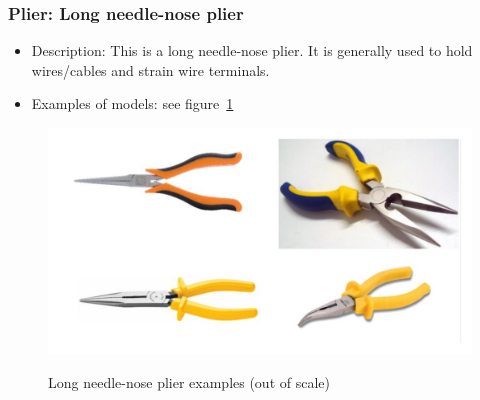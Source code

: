 \subsubsection{Plier: Long needle-nose plier} \label{DEVICE:TOOLPLIERNEEDLENOSE}
\begin{itemize}
  \item Description: This is a long needle-nose plier. It is generally used to hold wires/cables and strain wire terminals.
  \item Examples of models: see figure~\ref{FIG:DEVICETOOLPLIERNEEDLENOSE}
\end{itemize}
\begin{figure}
  \centering
  \includegraphics[angle=90,width=1\columnwidth]{figs/body02/FIGDEVICETOOLPLIERNEEDLENOSE.pdf}\\
  \caption[Long needle-nose plier examples (out of scale)]{Long needle-nose plier examples (out of scale)}
  \label{FIG:DEVICETOOLPLIERNEEDLENOSE}
\end{figure}
